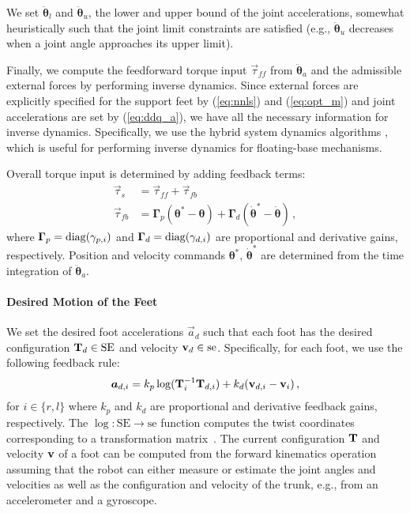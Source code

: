 \documentclass{llncs}
\newcommand{\mGamma} {\boldsymbol{\Gamma}}
\newcommand {\mat}[1] {{\bf #1}}
\newcommand{\mT} {\mat{T}}
\newcommand \se     {\mathrm{se}}
\newcommand \SE     {\mathrm{SE}}
\newcommand{\vddth} {\boldsymbol{\ddot{\theta}}}
\newcommand{\sv} {{\bf v}} %
\newcommand{\vth} {\boldsymbol{\theta}}
\newcommand{\vdth} {\boldsymbol{\dot{\theta}}}
\newcommand{\vtau}{\vec{\tau}}
\newcommand{\va}{\vec{a}}
\newcommand{\diag}{{\rm diag}}
\begin{document}
We set $\vddth_l$ and $\vddth_u$, the lower and upper bound
of the joint accelerations, somewhat heuristically
such that the joint limit constraints are satisfied (e.g.,
$\vddth_u$ decreases when a joint angle approaches its upper limit).

Finally, we compute the feedforward torque input $\vtau_{ff}$ from $\vddth_a$
and the admissible external forces by performing inverse dynamics.
Since external forces are explicitly specified for the
support feet by (\ref{eq:nnls}) and (\ref{eq:opt_m})
and joint accelerations are set by (\ref{eq:ddq_a}),
we have all the necessary information for inverse dynamics.
Specifically, we use the hybrid system dynamics algorithms \cite{Featherstone87},
which is useful for performing inverse dynamics for floating-base
mechanisms.


Overall torque input is determined by adding feedback terms:
\begin{align}
	\vtau_s &= \vtau_{ff} + \vtau_{fb} \label{eq:tau_s}\\
	\vtau_{fb} &= \mGamma_p ( \vth^\ast - \vth ) + \mGamma_d ( \vdth^\ast - \vdth ) \, ,
\end{align}
where $\mGamma_p=\diag(\gamma_{p,i})$ and $\mGamma_d=\diag(\gamma_{d,i})$ are proportional and derivative gains, respectively.
Position and velocity commands $\vth^\ast$, $\vdth^\ast$ are determined from
the time integration of $\vddth_a$.


\paragraph{Desired Motion of the Feet}
\label{sec:desired_feet}
We set the desired foot accelerations $\va_d$ such that each
foot has the desired configuration $\mT_d\in\SE$ and velocity $\sv_d\in\se$.
Specifically, for each foot, we use the following feedback rule:
\begin{equation}
	\va_{d,i} = k_p\log(\mT_i^{-1}\mT_{d,i}) + k_d ( \sv_{d,i} - \sv_i ) \, ,
\end{equation}
for $i\in\{r,l\}$ where $k_p$ and $k_d$ are proportional and
derivative feedback gains, respectively. The
$\log:\SE \rightarrow \se$ function computes the twist coordinates
corresponding to a transformation matrix~\cite{MLS94}.
The current configuration  $\mT$ and velocity $\sv$ of a foot
can be computed from the forward kinematics operation
assuming that the robot can either measure or estimate
the joint angles and velocities as well as
the configuration and velocity of the trunk, e.g., from an accelerometer
and a gyroscope.
\end{document}
